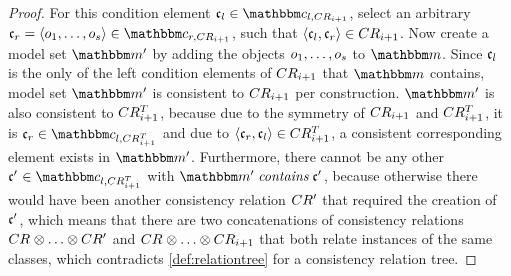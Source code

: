 \begin{proof}
    For this condition element $\conditionelement{c}{l} \in \condition{c}{l,\consistencyrelation{CR}{i+1}}$, select an arbitrary $\conditionelement{c}{r} = \tupled{\object{o}{1}, \dots, \object{o}{s}} \in \condition{c}{r, \consistencyrelation{CR}{i+1}}$, such that $\langle \mathfrak{c}_{l}, \mathfrak{c}_{r} \rangle \in CR_{i+1}$.
    Now create a model set $\modelset{m'}$ by adding the objects $o_{1}, \dots, o_{s}$ to $\modelset{m}$.
    Since $\mathfrak{c}_{l}$ is the only of the left condition elements of $CR_{i+1}$ that $\modelset{m}$ contains, model set $\modelset{m'}$ is consistent to $CR_{i+1}$ per construction.
    $\modelset{m'}$ is also consistent to $CR^T_{i+1}$, because due to the symmetry of $CR_{i+1}$ and $CR^T_{i+1}$, it is $\conditionelement{c}{r} \in \condition{c}{l,\consistencyrelation{CR^T}{i+1}}$ and due to $\langle \mathfrak{c}_{r}, \mathfrak{c}_{l} \rangle \in CR^T_{i+1}$, a consistent corresponding element exists in $\modelset{m'}$. 
    Furthermore, there cannot be any other $\conditionelement{c'}{} \in \condition{c}{l,\consistencyrelation{CR^T}{i+1}}$ with $\modelset{m'} \containsmath \conditionelement{c'}{}$, because otherwise there would have been another consistency relation $CR'_{}$ that required the creation of $\mathfrak{c'}_{}$, which means that there are two concatenations of consistency relations $\consistencyrelation{CR}{} \concat \dots \concat \consistencyrelation{CR'}{}$ and $\consistencyrelation{CR}{} \concat \dots \concat \consistencyrelation{CR}{i+1}$ that both relate instances of the same classes, which contradicts \autoref{def:relationtree} for a consistency relation tree.
    

\end{proof}
